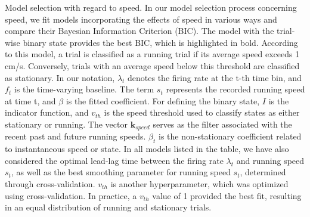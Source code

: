 \documentclass[12pt]{article}
\begin{document}
\begin{table}
\caption{Model selection with regard to speed. In our model selection process concerning speed, we fit models incorporating the effects of speed in various ways and compare their Bayesian Information Criterion (BIC). The model with the trial-wise binary state provides the best BIC, which is highlighted in bold. According to this model, a trial is classified as a running trial if its average speed exceeds 1 cm/s. Conversely, trials with an average speed below this threshold are classified as stationary. In our notation, $\lambda_t$ denotes the firing rate at the t-th time bin, and $f_t$ is the time-varying baseline. The term $s_t$ represents the recorded running speed at time t, and $\beta$ is the fitted coefficient. For defining the binary state, $I$ is the indicator function, and $v_{th}$ is the speed threshold used to classify states as either stationary or running. The vector $\mathbf{k}_{speed}$ serves as the filter associated with the recent past and future running speeds. $\beta_t$ is the non-stationary coefficient related to instantaneous speed or state. In all models listed in the table, we have also considered the optimal lead-lag time between the firing rate $\lambda_t$ and running speed $s_t$, as well as the best smoothing parameter for running speed $s_t$, determined through cross-validation. $v_{th}$ is another hyperparameter, which was optimized using cross-validation. In practice, a $v_{th}$ value of 1 provided the best fit, resulting in an equal distribution of running and stationary trials. }
\label{table: speed}
\end{table}



\end{document}
